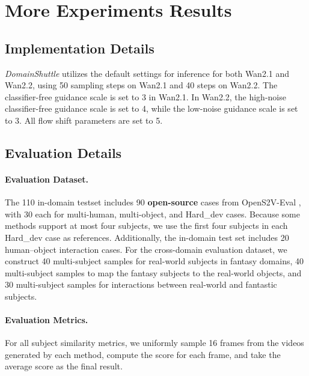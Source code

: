 \section{More Experiments Results}

\label{Experiments_Results}

\subsection{Implementation Details}

\textit{DomainShuttle} utilizes the default settings for inference for both Wan2.1 and Wan2.2, using 50 sampling steps on Wan2.1 and 40 steps on Wan2.2. The classifier-free guidance scale is set to 3 in Wan2.1. In Wan2.2, the high-noise classifier-free guidance scale is set to 4, while the low-noise guidance scale is set to 3. All flow shift parameters are set to 5.



\subsection{Evaluation Details}

\paragraph{\textbf{Evaluation Dataset.}} The 110 in-domain testset includes 90 \textbf{open-source} cases from OpenS2V-Eval \cite{yuan2025opens2v}, with 30 each for multi-human, multi-object, and Hard\_dev cases. Because some methods support at most four subjects, we use the first four subjects in each Hard\_dev case as references. Additionally, the in-domain test set includes 20 human–object interaction cases. For the cross-domain evaluation dataset, we construct 40 multi-subject samples for real-world subjects in fantasy domains, 40 multi-subject samples to map the fantasy subjects to the real-world objects, and 30 multi-subject samples for interactions between real-world and fantastic subjects.




\paragraph{\textbf{Evaluation Metrics.}} For all subject similarity metrics, we uniformly sample 16 frames from the videos generated by each method, compute the score for each frame, and take the average score as the final result.

